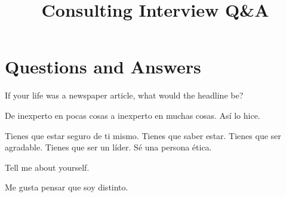 \documentclass{article}
\title{Consulting Interview Q\&A}
\author{}
\date{}
\begin{document}
\maketitle

\section*{Questions and Answers}

\begin{tcolorbox}[questionstyle]
    If your life was a newspaper article, what would the headline be?
\end{tcolorbox}

\begin{tcolorbox}[answerstyle]
    De inexperto en pocas cosas a inexperto en muchas cosas. Así lo hice.
\end{tcolorbox}

Tienes que estar seguro de ti mismo. Tienes que saber estar. Tienes que ser agradable. Tienes que ser un líder. Sé una persona ética.

\begin{tcolorbox}[questionstyle]
    Tell me about yourself.
\end{tcolorbox}

\begin{tcolorbox}[answerstyle]
    Me gusta pensar que soy distinto. 
\end{tcolorbox}
\end{document}
